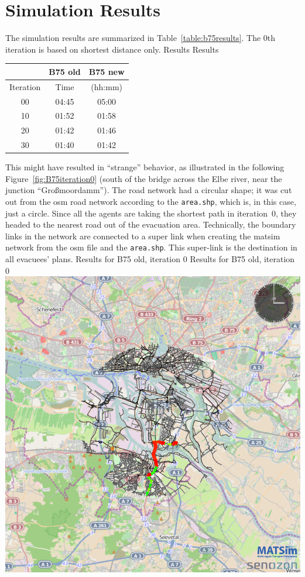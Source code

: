 \section{Simulation Results}
The simulation results are summarized in Table~\ref{table:b75results}. The 0th iteration is based on shortest distance only. 
%
\createtable%
{Results}%
{Results}%
{\label{table:b75results}}%
{%
\begin{tabular}{|c|c|c|}
	\hline \rule[-2ex]{0pt}{5.5ex}  & B75 old & B75 new \\ 
	\hline \rule[-2ex]{0pt}{5.5ex}  Iteration & Time &  (hh:mm) \\ 
	\hline \rule[-2ex]{0pt}{5.5ex}  00 & 04:45 &  05:00\\ 
	\hline \rule[-2ex]{0pt}{5.5ex}  10 & 01:52 &  01:58\\ 
	\hline \rule[-2ex]{0pt}{5.5ex}  20 & 01:42 &  01:46\\ 
	\hline \rule[-2ex]{0pt}{5.5ex}  30 & 01:40 &  01:42\\ 
	\hline 
\end{tabular}
}%
{}%
%
This might have resulted in ``strange'' behavior, as illustrated in the following Figure~\ref{fig:B75iteration0} (south of the bridge across the Elbe river, near the junction ``Gro{\ss}moordamm''). The road network had a circular shape; it was cut out from the \gls{osm} road network according to the \lstinline|area.shp|, which is, in this case, just a circle. Since all the agents are taking the shortest path in iteration~0, they headed to the nearest road out of the evacuation area. Technically, the boundary links in the network are connected to a super link when creating the \gls{matsim} network from the \gls{osm} file and the \lstinline|area.shp|. This super-link is the destination in all evacuees' plans. 
%
\createfigure%
{Results for B75 old, iteration 0}%
{Results for B75 old, iteration 0}%
{\label{fig:B75iteration0}}%
{\includegraphics[width=0.7\linewidth]{scenarios/figures/B75iteration0}}%
